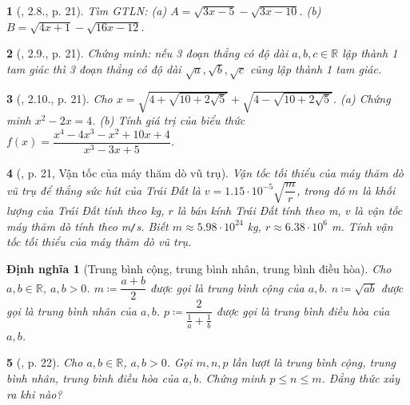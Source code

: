 \documentclass{article}
\newtheorem{baitoan}{}%
\newtheorem{dinhnghia}{Định nghĩa}
\begin{document}
\begin{baitoan}[\cite{Binh_boi_duong_Toan_9_tap_1}, 2.8., p. 21]
	Tìm {\rm GTLN}: (a) $A = \sqrt{3x - 5} - \sqrt{3x - 10}$. (b) $B = \sqrt{4x + 1} - \sqrt{16x - 12}$.
\end{baitoan}

\begin{baitoan}[\cite{Binh_boi_duong_Toan_9_tap_1}, 2.9., p. 21]
	Chứng minh: nếu 3 đoạn thẳng có độ dài $a,b,c\in\mathbb{R}$ lập thành 1 tam giác thì 3 đoạn thẳng có độ dài $\sqrt{a},\sqrt{b},\sqrt{c}$ cũng lập thành 1 tam giác.
\end{baitoan}

\begin{baitoan}[\cite{Binh_boi_duong_Toan_9_tap_1}, 2.10., p. 21]
	Cho $x = \sqrt{4 + \sqrt{10 + 2\sqrt{5}}} + \sqrt{4 - \sqrt{10 + 2\sqrt{5}}}$. (a) Chứng minh $x^2 - 2x = 4$. (b) Tính giá trị của biểu thức $f(x) = \dfrac{x^4 - 4x^3 - x^2 + 10x + 4}{x^3 - 3x + 5}$.
\end{baitoan}

\begin{baitoan}[\cite{Binh_boi_duong_Toan_9_tap_1}, p. 21, Vận tốc của máy thăm dò vũ trụ]
	Vận tốc tối thiểu của máy thăm dò vũ trụ để thắng sức hút của Trái Đất là $v = 1.15\cdot10^{-5}\sqrt{\dfrac{m}{r}}$, trong đó $m$ là khối lượng của Trái Đất tính theo {\rm kg}, $r$ là bán kính Trái Đất tính theo {\rm m}, $v$ là vận tốc máy thăm dò tính theo {\rm m{\tt/}s}. Biết $m\approx5.98\cdot10^{24}$ {\rm kg}, $r\approx6.38\cdot10^6$ {\rm m}. Tính vận tốc tối thiểu của máy thăm dò vũ trụ.
\end{baitoan}

\begin{dinhnghia}[Trung bình cộng, trung bình nhân, trung bình điều hòa]
	Cho $a,b\in\mathbb{R}$, $a,b > 0$. $m\coloneqq\dfrac{a + b}{2}$ được gọi là {\rm trung bình cộng} của $a,b$. $n\coloneqq\sqrt{ab}$ được gọi là {\rm trung bình nhân} của $a,b$. $p\coloneqq\dfrac{2}{\frac{1}{a} + \frac{1}{b}}$ được gọi là {\rm trung bình điều hòa} của $a,b$.
\end{dinhnghia}

\begin{baitoan}[\cite{Binh_boi_duong_Toan_9_tap_1}, p. 22]
	Cho $a,b\in\mathbb{R}$, $a,b > 0$. Gọi $m,n,p$ lần lượt là trung bình cộng, trung bình nhân, trung bình điều hòa của $a,b$. Chứng minh $p\le n\le m$. Đẳng thức xảy ra khi nào?
\end{baitoan}
\end{document}
